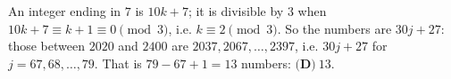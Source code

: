 An integer ending in $7$ is $10k+7$; it is divisible by $3$ when $10k+7\equiv k+1\equiv0\pmod3$, i.e. $k\equiv2\pmod3$. So the numbers are $30j+27$: those between $2020$ and $2400$ are $2037,2067,\dots,2397$, i.e. $30j+27$ for $j=67,68,\dots,79$. That is $79-67+1=13$ numbers: $\boxed{\textbf{(D)}\ 13}$.
